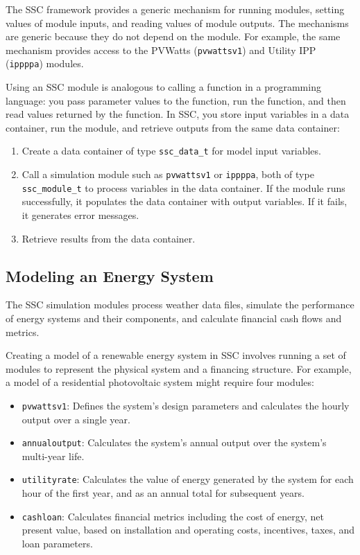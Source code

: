 \documentclass{scrartcl} %
\begin{document}
The SSC framework provides a generic mechanism for running modules, setting values of module inputs, and reading values of module outputs. The mechanisms are generic because they do not depend on the module. For example, the same mechanism provides access to the PVWatts (\texttt{pvwattsv1}) and Utility IPP (\texttt{ippppa}) modules.  

Using an SSC module is analogous to calling a function in a programming language: you pass parameter values to the function, run the function, and then read values returned by the function.  In SSC, you store input variables in a data container, run the module, and retrieve outputs from the same data container:

\begin{enumerate}
\item Create a data container of type \texttt{ssc\_data\_t} for model input variables.
\item Call a simulation module such as \texttt{pvwattsv1} or \texttt{ippppa}, both of type \texttt{ssc\_module\_t} to process variables in the data container. If the module runs successfully, it populates the data container with output variables. If it fails, it generates error messages.
\item Retrieve results from the data container.
\end{enumerate}

\subsection{Modeling an Energy System}
\label{sec_modeling_systems}

The SSC simulation modules process weather data files, simulate the performance of energy systems and their components, and calculate financial cash flows and metrics.

Creating a model of a renewable energy system in SSC involves running a set of modules to represent the physical system and a financing structure. For example, a model of a residential photovoltaic system might require four modules:

\begin{itemize}
\item \texttt{pvwattsv1}: Defines the system's design parameters and calculates the hourly output over a single year.
\item \texttt{annualoutput}: Calculates the system's annual output over the system's multi-year life.
\item \texttt{utilityrate}: Calculates the value of energy generated by the system for each hour of the first year, and as an annual total for subsequent years.
\item \texttt{cashloan}: Calculates financial metrics including the cost of energy, net present value, based on installation and operating costs, incentives, taxes, and loan parameters.
\end{itemize}
\end{document}
